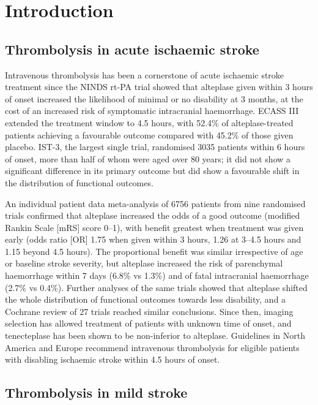 \section{Introduction}

\subsection*{Thrombolysis in acute ischaemic stroke}

Intravenous thrombolysis has been a cornerstone of acute ischaemic stroke treatment since the NINDS rt-PA trial showed that alteplase given within 3 hours of onset increased the likelihood of minimal or no disability at 3 months, at the cost of an increased risk of symptomatic intracranial haemorrhage.\cite{ninds1995} ECASS III extended the treatment window to 4.5 hours, with 52.4\% of alteplase-treated patients achieving a favourable outcome compared with 45.2\% of those given placebo.\cite{hacke2008} IST-3, the largest single trial, randomised 3035 patients within 6 hours of onset, more than half of whom were aged over 80 years; it did not show a significant difference in its primary outcome but did show a favourable shift in the distribution of functional outcomes.\cite{ist32012}

An individual patient data meta-analysis of 6756 patients from nine randomised trials confirmed that alteplase increased the odds of a good outcome (modified Rankin Scale [mRS] score 0--1), with benefit greatest when treatment was given early (odds ratio [OR] 1.75 when given within 3 hours, 1.26 at 3--4.5 hours and 1.15 beyond 4.5 hours).\cite{emberson2014} The proportional benefit was similar irrespective of age or baseline stroke severity, but alteplase increased the risk of parenchymal haemorrhage within 7 days (6.8\% vs 1.3\%) and of fatal intracranial haemorrhage (2.7\% vs 0.4\%).\cite{emberson2014} Further analyses of the same trials showed that alteplase shifted the whole distribution of functional outcomes towards less disability,\cite{lees2016} and a Cochrane review of 27 trials reached similar conclusions.\cite{wardlaw2014} Since then, imaging selection has allowed treatment of patients with unknown time of onset,\cite{thomalla2018} and tenecteplase has been shown to be non-inferior to alteplase.\cite{menon2022} Guidelines in North America and Europe recommend intravenous thrombolysis for eligible patients with disabling ischaemic stroke within 4.5 hours of onset.\cite{powers2019,berge2021}

\subsection*{Thrombolysis in mild stroke}

